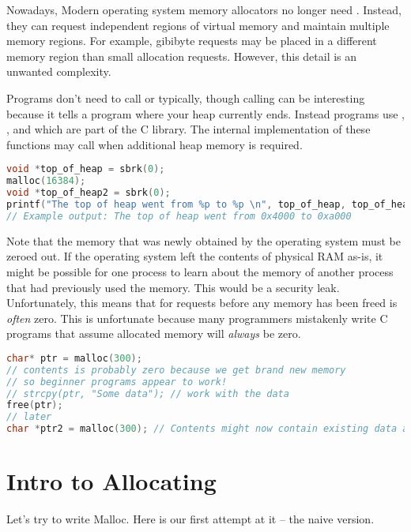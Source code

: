 Nowadays, Modern operating system memory allocators no longer need .
Instead, they can request independent regions of virtual memory and maintain multiple memory regions.
For example, gibibyte requests may be placed in a different memory region than small allocation requests.
However, this detail is an unwanted complexity.

Programs don't need to call  or  typically, though calling  can be interesting because it tells a program where your heap currently ends.
Instead programs use , ,  and  which are part of the C library.
The internal implementation of these functions may call  when additional heap memory is required.

\begin{lstlisting}[language=C]
void *top_of_heap = sbrk(0);
malloc(16384);
void *top_of_heap2 = sbrk(0);
printf("The top of heap went from %p to %p \n", top_of_heap, top_of_heap2);
// Example output: The top of heap went from 0x4000 to 0xa000
\end{lstlisting}

Note that the memory that was newly obtained by the operating system must be zeroed out.
If the operating system left the contents of physical RAM as-is, it might be possible for one process to learn about the memory of another process that had previously used the memory.
This would be a security leak.
Unfortunately, this means that for  requests before any memory has been freed is \emph{often} zero.
This is unfortunate because many programmers mistakenly write C programs that assume allocated memory will \emph{always} be zero.

\begin{lstlisting}[language=C]
char* ptr = malloc(300);
// contents is probably zero because we get brand new memory
// so beginner programs appear to work!
// strcpy(ptr, "Some data"); // work with the data
free(ptr);
// later
char *ptr2 = malloc(300); // Contents might now contain existing data and is probably not zero
\end{lstlisting}

\section{Intro to Allocating}

Let's try to write Malloc.
Here is our first attempt at it -- the naive version.

